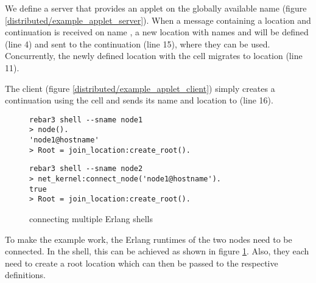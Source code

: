\begin{example}[Applet]

  We define a server that provides an applet on the globally available name
   (figure \ref{distributed/example_applet_server}).
  When a message containing a location  and continuation
  is received on name ,
  a new location with names  and  will be defined (line 4)
  and sent to the continuation (line 15), where they can be used.
  Concurrently, the newly defined location with the cell migrates to location
   (line 11).

  The client (figure \ref{distributed/example_applet_client})
  simply creates a continuation using the cell and sends its name and location
  to  (line 16).

  \begin{figure}
    \begin{lstlisting}
rebar3 shell --sname node1
> node().
'node1@hostname'
> Root = join_location:create_root().
    \end{lstlisting}
    \begin{lstlisting}
rebar3 shell --sname node2
> net_kernel:connect_node('node1@hostname').
true
> Root = join_location:create_root().
    \end{lstlisting}
  \caption{connecting multiple Erlang shells}
  \label{connecting_shells}
  \end{figure}



\end{example}

To make the example work, the Erlang runtimes of the two nodes need to be
connected. In the shell, this can be achieved as shown in figure
\ref{connecting_shells}.
Also, they each need to create a root location
which can then be passed to the respective definitions.
